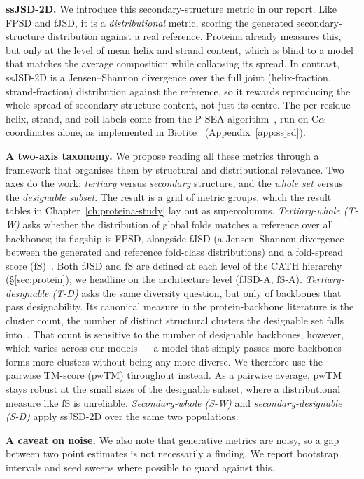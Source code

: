 \documentclass[12pt,a4paper,twoside]{report}
\begin{document}
\textbf{ssJSD-2D.} We introduce this secondary-structure metric in our report. Like FPSD and fJSD, it is a \emph{distributional} metric, scoring the generated secondary-structure distribution against a real reference. Proteina already measures this, but only at the level of mean helix and strand content, which is blind to a model that matches the average composition while collapsing its spread. In contrast, ssJSD-2D is a Jensen--Shannon divergence over the full joint (helix-fraction, strand-fraction) distribution against the reference, so it rewards reproducing the whole spread of secondary-structure content, not just its centre. The per-residue helix, strand, and coil labels come from the P-SEA algorithm~\cite{PSEA}, run on C$\alpha$ coordinates alone, as implemented in Biotite~\cite{Biotite} (Appendix~\ref{app:ssjsd}).

\textbf{A two-axis taxonomy.} We propose reading all these metrics through a framework that organises them by structural and distributional relevance. Two axes do the work: \emph{tertiary} versus \emph{secondary} structure, and the \emph{whole set} versus the \emph{designable subset}. The result is a grid of metric groups, which the result tables in Chapter~\ref{ch:proteina-study} lay out as supercolumns. \emph{Tertiary-whole (T-W)} asks whether the distribution of global folds matches a reference over all backbones; its flagship is FPSD, alongside fJSD (a Jensen--Shannon divergence between the generated and reference fold-class distributions) and a fold-spread score (fS)~\cite{Proteina}. Both fJSD and fS are defined at each level of the CATH hierarchy (\S\ref{sec:protein}); we headline on the architecture level (fJSD-A, fS-A). \emph{Tertiary-designable (T-D)} asks the same diversity question, but only of backbones that pass designability. Its canonical measure in the protein-backbone literature is the cluster count, the number of distinct structural clusters the designable set falls into~\cite{Proteina}. That count is sensitive to the number of designable backbones, however, which varies across our models --- a model that simply passes more backbones forms more clusters without being any more diverse. We therefore use the pairwise TM-score (pwTM) throughout instead. As a pairwise average, pwTM stays robust at the small sizes of the designable subset, where a distributional measure like fS is unreliable. \emph{Secondary-whole (S-W)} and \emph{secondary-designable (S-D)} apply ssJSD-2D over the same two populations.

\textbf{A caveat on noise.} We also note that generative metrics are noisy, so a gap between two point estimates is not necessarily a finding. We report bootstrap intervals and seed sweeps where possible to guard against this.
\end{document}
